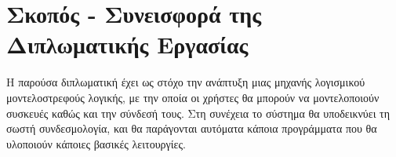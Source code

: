 \section{Σκοπός - Συνεισφορά της Διπλωματικής Εργασίας}
\label{section:contribution}

Η παρούσα διπλωματική έχει ως στόχο την ανάπτυξη μιας μηχανής λογισμικού μοντελοστρεφούς λογικής, με την οποία οι χρήστες θα μπορούν να μοντελοποιούν συσκευές καθώς και την σύνδεσή τους. Στη συνέχεια το σύστημα θα υποδεικνύει τη σωστή συνδεσμολογία, και θα παράγονται αυτόματα κάποια προγράμματα που θα υλοποιούν κάποιες βασικές λειτουργίες.